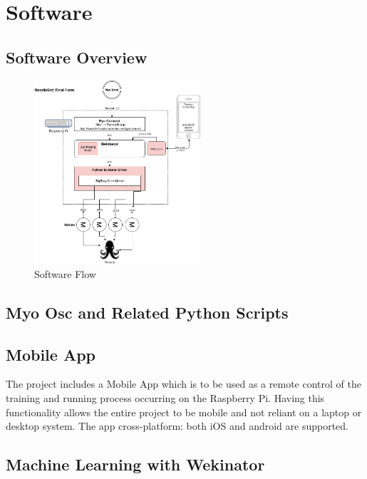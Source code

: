 \documentclass[12pt,a4paper]{article}
\begin{document}
\section{Software}

\subsection{Software Overview}

\begin{figure}[h!]
\centering
\includegraphics[width=0.55\textwidth]{SoftwareFlow.png}\par\vspace{1cm}
\caption{Software Flow}
\label{fig:flow}
\end{figure}

\subsection{Myo Osc and Related Python Scripts}

\subsection{Mobile App}


The project includes a Mobile App which is to be used as a remote control of the training and running process occurring on the Raspberry Pi. Having this functionality allows the entire project to be mobile and not reliant on a laptop or desktop system. The app cross-platform: both iOS and android are supported. 

\subsection{Machine Learning with Wekinator}
\end{document}
